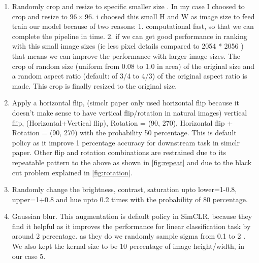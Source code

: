 \begin{enumerate}
  \item Randomly crop  and resize to specific smaller size . In my case I choosed to crop and resize to $96 \times 96$. i choosed this small H and W as 
  image size to feed train our model because of two reasons: 1. computational fast, so that we can complete the pipeline in time. 2. if we can get good performance in ranking with this small image sizes (ie less pixel details
compared to 2054 * 2056 ) that means we can improve the performance with larger image sizes. The crop of random size (uniform from 0.08 to 1.0 in area) of the 
   original size and a random aspect ratio (default: of 3/4 to 4/3) of the original aspect ratio is made. This crop is finally resized to the original size.

  \item Apply a horizontal flip, (simclr paper only used horizontal flip because it doesn't make sense to have vertical flip/rotation in natural images) vertical 
  flip, (Horizontal+Vertical flip), Rotation = (90, 270), Horizontal flip + Rotation = (90, 270) with the probability 50 percentage. This is default policy as it
   improve 1 percentage accuracy for downstream task in simclr paper. Other flip and rotation combinations are restrained due to its repeatable pattern to the above as shown in \ref{fig:repeat} and due to the black cut problem explained in 
  \ref{fig:rotation}.

  \item Randomly change the brightness, contrast, saturation  upto lower=1-0.8, upper=1+0.8 and hue upto 0.2 times with the probability of 80 percentage.
  
  \item Gaussian blur. This augmentation is default policy in SimCLR, because they find it helpful as  it improves the performance for linear classification task
   by around 2 percentage. as they do we randomly sample sigma from 0.1 to 2 . We also kept the kernal size to be 10 percentage of image height/width, in our case 5.
\end{enumerate}



